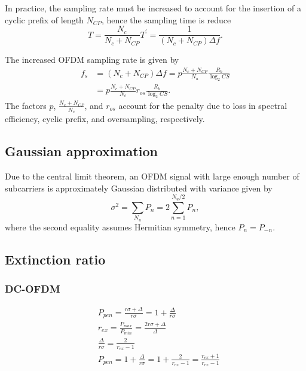\documentclass[a4paper]{article}
\begin{document}
In practice, the sampling rate must be increased to account for the insertion of a cyclic prefix of length $N_{CP}$, hence the sampling time is reduce
\begin{equation}
T = \frac{N_c}{N_c + N_{CP}}T^{\prime} = \frac{1}{(N_c + N_{CP})\Delta f}.
\end{equation}

The increased OFDM sampling rate is given by
\begin{align} \nonumber
f_s &= (N_c + N_{CP})\Delta f = p\frac{N_c + N_{CP}}{N_u}\frac{R_b}{\log_2 CS} \\
&= p\frac{N_c + N_{CP}}{N_c}r_{os}\frac{R_b}{\log_2 CS}.
\end{align}
The factors $p$, $\frac{N_c + N_{CP}}{N_c}$, and $r_{os}$ account for the penalty due to loss in spectral efficiency, cyclic prefix, and oversampling, respectively. 

\subsection{Gaussian approximation}

Due to the central limit theorem, an OFDM signal with large enough number of subcarriers is approximately Gaussian distributed with variance given by
\begin{equation}
\sigma^2 = \sum_{N_u} P_n = 2\sum_{n=1}^{N_u/2} P_n,
\end{equation}
where the second equality assumes Hermitian symmetry, hence $P_n = P_{-n}$. 



\subsection{Extinction ratio}
\subsubsection{DC-OFDM}
\begin{align} \nonumber
& P_{pen} = \frac{r\sigma + \Delta}{r\sigma} = 1 + \frac{\Delta}{r\sigma} \\
&r_{ex} = \frac{P_{max}}{P_{min}} = \frac{2r\sigma + \Delta}{\Delta} \\ \nonumber
&\frac{\Delta}{r\sigma} = \frac{2}{r_{ex}-1} \\ 
& P_{pen} = 1 + \frac{\Delta}{r\sigma} = 1 + \frac{2}{r_{ex}-1} = \frac{r_{ex}+1}{r_{ex}-1}
\end{align}
\end{document}
